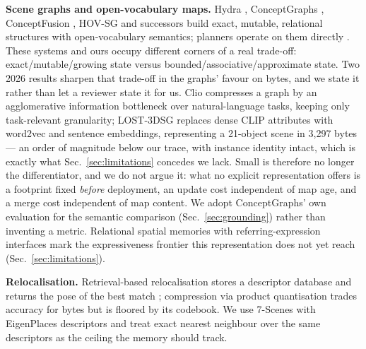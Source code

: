 \documentclass[conference]{IEEEtran}
\begin{document}
\textbf{Scene graphs and open-vocabulary maps.} Hydra
\cite{hughes2022hydra}, ConceptGraphs \cite{gu2024conceptgraphs},
ConceptFusion \cite{jatavallabhula2023conceptfusion}, HOV-SG
\cite{werby2024hovsg} and successors \cite{keysg2025} build exact,
mutable, relational structures with open-vocabulary semantics; planners
operate on them directly \cite{agia2022taskography}. These systems and
ours occupy different corners of a real trade-off: exact/mutable/growing
state versus bounded/associative/approximate state. Two 2026 results
sharpen that trade-off in the graphs' favour on bytes, and we state it
rather than let a reviewer state it for us. Clio \cite{maggio2024clio}
compresses a graph by an agglomerative information bottleneck over
natural-language tasks, keeping only task-relevant granularity;
LOST-3DSG \cite{ferraina2026lost3dsg} replaces dense CLIP attributes
with word2vec and sentence embeddings, representing a 21-object scene in
3{,}297 bytes --- an order of magnitude below our trace, with instance
identity intact, which is exactly what Sec.~\ref{sec:limitations}
concedes we lack. Small is therefore no longer the differentiator, and
we do not argue it: what no explicit representation offers is a
footprint fixed \emph{before} deployment, an update cost independent of
map age, and a merge cost independent of map content. We adopt
ConceptGraphs' own evaluation for the semantic comparison
(Sec.~\ref{sec:grounding}) rather than inventing a metric. Relational
spatial memories with referring-expression interfaces \cite{farm2026}
mark the expressiveness frontier this representation does not yet reach
(Sec.~\ref{sec:limitations}).

\textbf{Relocalisation.} Retrieval-based relocalisation stores a
descriptor database and returns the pose of the best match
\cite{sattler2019understanding}; compression via product quantisation
\cite{jegou2011product} trades accuracy for bytes but is floored by its
codebook. We use 7-Scenes \cite{shotton2013scene} with EigenPlaces
descriptors \cite{berton2023eigenplaces} and treat exact nearest
neighbour over the same descriptors as the ceiling the memory should
track.
\end{document}
